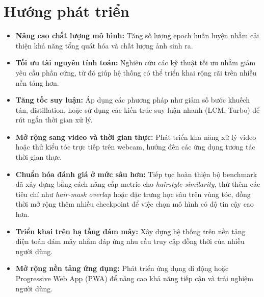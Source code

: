 \documentclass[../main.tex]{subfiles}
\begin{document}
\section{Hướng phát triển}
\begin{itemize}
    \item \textbf{Nâng cao chất lượng mô hình:} Tăng số lượng epoch huấn luyện nhằm cải thiện khả năng tổng quát hóa và chất lượng ảnh sinh ra.
    
    \item \textbf{Tối ưu tài nguyên tính toán:} Nghiên cứu các kỹ thuật tối ưu nhằm giảm yêu cầu phần cứng, từ đó giúp hệ thống có thể triển khai rộng rãi trên nhiều nền tảng hơn.
    
    \item \textbf{Tăng tốc suy luận:} Áp dụng các phương pháp như giảm số bước khuếch tán, distillation, hoặc sử dụng các kiến trúc suy luận nhanh (LCM, Turbo) để rút ngắn thời gian xử lý.
    
    \item \textbf{Mở rộng sang video và thời gian thực:} Phát triển khả năng xử lý video hoặc thử kiểu tóc trực tiếp trên webcam, hướng đến các ứng dụng tương tác thời gian thực.
    
    \item \textbf{Chuẩn hóa đánh giá ở mức sâu hơn:} Tiếp tục hoàn thiện bộ benchmark đã xây dựng bằng cách nâng cấp metric cho \textit{hairstyle similarity}, thử thêm các tiêu chí như \textit{hair-mask overlap} hoặc đặc trưng học sâu trên vùng tóc, đồng thời mở rộng thêm nhiều checkpoint để việc chọn mô hình có độ tin cậy cao hơn.
    
    \item \textbf{Triển khai trên hạ tầng đám mây:} Xây dựng hệ thống trên nền tảng điện toán đám mây nhằm đáp ứng nhu cầu truy cập đồng thời của nhiều người dùng.
    
    \item \textbf{Mở rộng nền tảng ứng dụng:} Phát triển ứng dụng di động hoặc Progressive Web App (PWA) để nâng cao khả năng tiếp cận và trải nghiệm người dùng.
\end{itemize}
\end{document}
